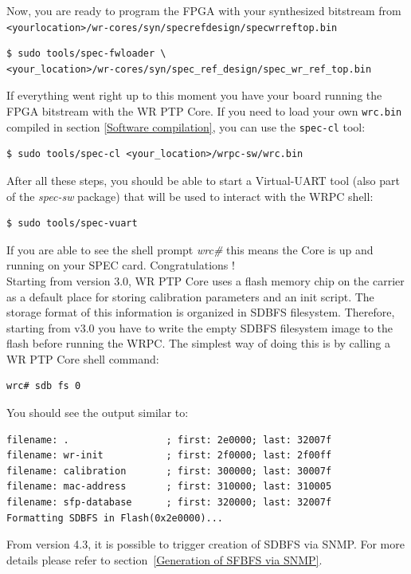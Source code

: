 \documentclass[a4paper, 12pt]{article}
\renewcommand{\_}{\underscore\allowbreak}
\begin{document}
Now, you are ready to program the FPGA with your synthesized bitstream from
\texttt{<your\_location>/wr-cores/syn/spec\_ref\_design/spec\_wr\_ref\_top.bin}
\begin{lstlisting}
$ sudo tools/spec-fwloader \
<your_location>/wr-cores/syn/spec_ref_design/spec_wr_ref_top.bin
\end{lstlisting}

If everything went right up to this moment you have your board running the FPGA
bitstream with the WR PTP Core. If you need to load your own \texttt{wrc.bin}
compiled in section \ref{Software compilation}, you can use the
\texttt{spec-cl} tool:
\begin{lstlisting}
$ sudo tools/spec-cl <your_location>/wrpc-sw/wrc.bin
\end{lstlisting}

After all these steps, you should be able to start a Virtual-UART tool (also
part of the \textit{spec-sw} package) that will be used to interact with the
WRPC shell:
\begin{lstlisting}
$ sudo tools/spec-vuart
\end{lstlisting}
If you are able to see the shell prompt \textit{wrc\#} this means the Core
is up and running on your SPEC card. Congratulations !\\

Starting from version 3.0, WR PTP Core uses a flash memory chip on the carrier
as a default place for storing calibration parameters and an init script.
The storage format of this information is organized in SDBFS filesystem.
Therefore, starting from v3.0 you have to write the empty
SDBFS filesystem image to the flash before running the WRPC. The simplest way of
doing this is by calling a WR PTP Core shell command:
\begin{lstlisting}
wrc# sdb fs 0
\end{lstlisting}
You should see the output similar to:
\begin{lstlisting}[basicstyle=\scriptsize\ttfamily]
filename: .                 ; first: 2e0000; last: 32007f
filename: wr-init           ; first: 2f0000; last: 2f00ff
filename: calibration       ; first: 300000; last: 30007f
filename: mac-address       ; first: 310000; last: 310005
filename: sfp-database      ; first: 320000; last: 32007f
Formatting SDBFS in Flash(0x2e0000)...
\end{lstlisting}
From version 4.3, it is possible to trigger creation of SDBFS via SNMP.
For more details please refer to section~\ref{Generation of SFBFS via SNMP}.
\end{document}
